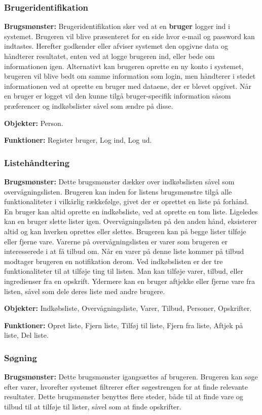 \subsubsection*{Brugeridentifikation}
\textbf{Brugsmønster:} Brugeridentifikation sker ved at en \textbf{bruger} logger ind i systemet. 
Brugeren vil blive præsenteret for en side hvor e-mail og password kan indtastes.
Herefter godkender eller afviser systemet den opgivne data og håndterer resultatet, enten ved at logge brugeren ind, eller bede om informationen igen.
Alternativt kan brugeren oprette en ny konto i systemet, brugeren vil blive bedt om samme information som login, men håndterer i stedet informationen ved at oprette en bruger med dataene, der er blevet opgivet.
Når en bruger er logget vil den kunne tilgå bruger-specifik information såsom præferencer og indkøbslister såvel som ændre på disse.

\textbf{Objekter:} Person.

\textbf{Funktioner:} Register bruger, Log ind, Log ud.

\subsubsection*{Listehåndtering}
\textbf{Brugsmønster:} Dette brugsmønster dækker over indkøbslisten såvel som overvågningslisten. 
Brugeren kan inden for listens brugsmønstre tilgå alle funktionaliteter i vilkårlig rækkefølge, givet der er oprettet en liste på forhånd. 
En bruger kan altid oprette en indkøbsliste, ved at oprette en tom liste.
Ligeledes kan en bruger slette lister igen.
Overvågningslisten på den anden hånd, eksisterer altid og kan hverken oprettes eller slettes.
Brugeren kan på begge lister tilføje eller fjerne vare.
Varerne på overvågningslisten er varer som brugeren er interesserede i at få tilbud om. 
Når en varer på denne liste kommer på tilbud modtager brugeren en notifikation derom.
Ved indkøbslisten er der tre funktionaliteter til at tilføje ting til listen.
Man kan tilføje varer, tilbud, eller ingredienser fra en opskrift.
Ydermere kan en bruger aftjekke eller fjerne vare fra listen, såvel som dele deres liste med andre brugere.

\textbf{Objekter:} Indkøbsliste, Overvågningsliste, Varer, Tilbud, Personer, Opskrifter.

\textbf{Funktioner:} Opret liste, Fjern liste, Tilføj til liste, Fjern fra liste, Aftjek på liste, Del liste.

\subsubsection*{Søgning}
\textbf{Brugsmønster:} Dette brugsmønster igangsættes af brugeren.
Brugeren kan søge efter varer, hvorefter systemet filtrerer efter søgestrengen for at finde relevante resultater.
Dette brugsmønster benyttes flere steder, både til at finde vare og tilbud til at tilføje til lister, såvel som at finde opskrifter.



